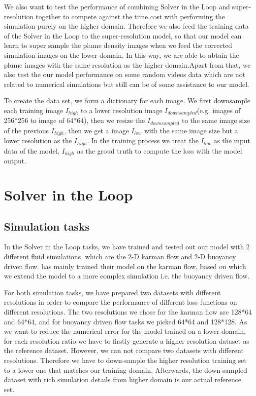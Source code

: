 \documentclass[a4paper,12pt,twoside]{report}
\begin{document}
We also want to test the performance of combining Solver in the Loop and super-resolution together to compete against the time cost with performing the simulation purely on the higher domain. Therefore we also feed the training data of the Solver in the Loop to the super-resolution model, so that our model can learn to super sample the plume density images when we feed the corrected simulation images on the lower domain. In this way, we are able to abtain the plume images with the same resolution as the higher domain.Apart from that, we also test the our model performance on some random videos data which are not related to numerical simulations but still can be of some assistance to our model.

To create the data set, we form a dictionary for each image. We first downsample each training image $I_{high}$ to a lower resolution image $I_{downsampled}$(e.g. images of 256*256 to image of 64*64), then we resize the $I_{downsampled}$ to the same image size of the previous $I_{high}$, then we get a image $I_{low}$ with the same image size but a lower resolution as the $I_{high}$. In the training process we treat the $I_{low}$ as the input data of the model, $I_{high}$ as the groud truth to compute the loss with the model output.
\section{Solver in the Loop}
\subsection{Simulation tasks}
In the Solver in the Loop tasks, we have trained and tested out our model with 2 different fluid simulations, which are the 2-D karman flow and 2-D buoyancy driven flow. \citeauthor{um2020sol} has mainly trained their model on the karman flow, based on which we extend the model to a more complex simulation i.e. the buoyancy driven flow. 

For both simulation tasks, we have prepared two datasets with different resolutions in order to compare the performance of different loss functions on different resolutions. The two resolutions we chose for the karman flow are 128*64 and 64*64, and for buoyancy driven flow tasks we picked 64*64 and 128*128. As we want to reduce the numerical error for the model trained on a lower domain, for each resolution ratio we have to firstly generate a higher resolution dataset as the reference dataset. However, we can not compare two datasets with different resolutions. Therefore we have to down-sample the higher resolution training set to a lower one that matches our training domain. Afterwards, the down-sampled dataset with rich simulation details from higher domain is our actual reference set.
\end{document}
